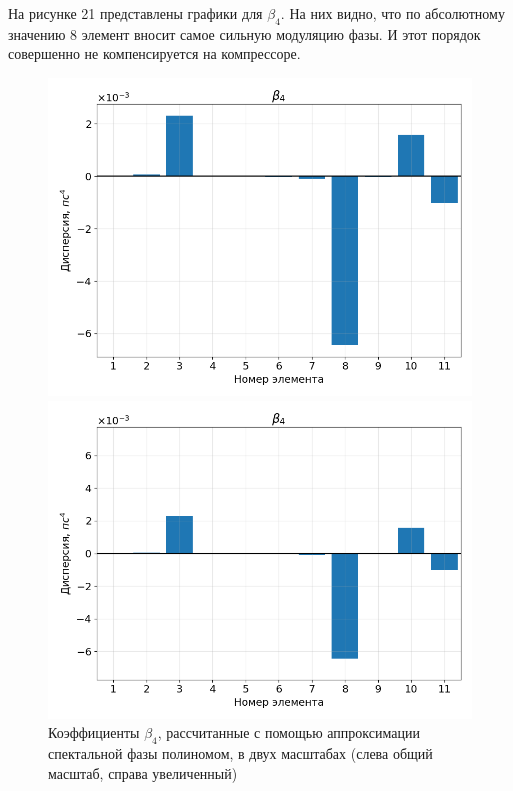 \documentclass[12pt]{article}
\begin{document}
На рисунке 21 представлены графики для $\beta_4$. На них видно, что по абсолютному значению 8 элемент вносит самое
сильную модуляцию фазы. И этот порядок совершенно не компенсируется на компрессоре.

\begin{figure}[h!]
    \centering
    \begin{minipage}[b]{0.5\textwidth}
        \includegraphics[width=\linewidth]{Images/Gauss Pulse x10/Беты/beta_4_full}
    \end{minipage}%
    \begin{minipage}[b]{0.5\textwidth}
        \includegraphics[width=\linewidth]{Images/Gauss Pulse x10/Беты/beta_4_cut}
    \end{minipage}

    \caption{Коэффициенты $\beta_4$, рассчитанные с помощью аппроксимации спектальной фазы полиномом,
     в двух масштабах (слева общий масштаб, справа увеличенный)}
    \label{fig:both}
\end{figure}
\end{document}
